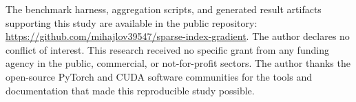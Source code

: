 \documentclass[AMA,twocolumn]{USG}
\begin{document}


\maketitle






The benchmark harness, aggregation scripts, and generated result artifacts supporting this study are available in the public repository: \url{https://github.com/mihajlov39547/sparse-index-gradient}.
The author declares no conflict of interest.
This research received no specific grant from any funding agency in the public, commercial, or not-for-profit sectors.
The author thanks the open-source PyTorch and CUDA software communities for the tools and documentation that made this reproducible study possible.

\end{document}
